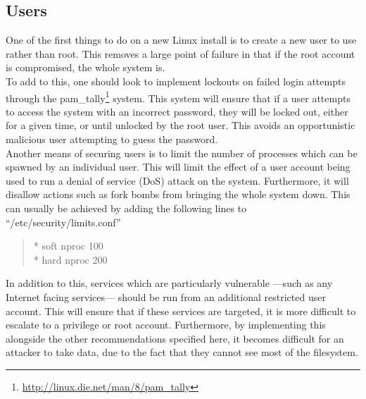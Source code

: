 			\subsection{Users}
				One of the first things to do on a new Linux install is to create a new user to use rather than root.
				This removes a large point of failure in that if the root account is compromised, the whole system is.\\
				To add to this, one should look to implement lockouts on failed login attempts through the pam\_tally\footnote{\url{http://linux.die.net/man/8/pam\_tally}} system.
				This system will ensure that if a user attempts to access the system with an incorrect password, they will be locked out, either for a given time, or until unlocked by the root user.
				This avoids an opportunistic malicious user attempting to guess the password. \\
				Another means of securing users is to limit the number of processes which can be spawned by an individual user.
				This will limit the effect of a user account being used to run a denial of service (DoS) attack on the system.
				Furthermore, it will disallow actions such as fork bombs from bringing the whole system down.
				This can usually be achieved by adding the following lines to ``/etc/security/limits.conf''
				\begin{quote}
					\begin{flushleft}
						\** soft nproc 100 \\
						\** hard nproc 200 \\
					\end{flushleft}
				\end{quote}

				In addition to this, services which are particularly vulnerable
				---such as any Internet facing services---
				should be run from an additional restricted user account.
				This will ensure that if these services are targeted, it is more difficult to escalate to a privilege or root account.
				Furthermore, by implementing this alongside the other recommendations specified here,
				it becomes difficult for an attacker to take data, due to the fact that they cannot see most of the filesystem.

